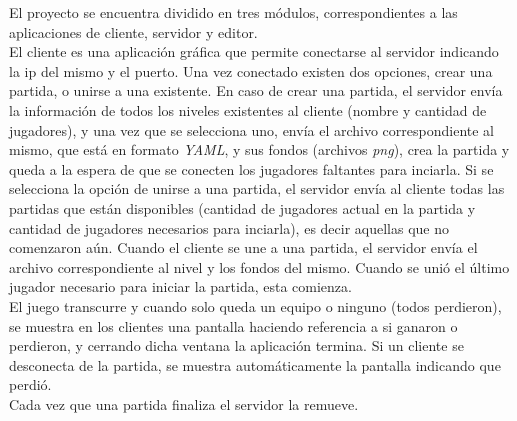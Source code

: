 El proyecto se encuentra dividido en tres módulos, correspondientes a las aplicaciones de cliente, servidor y editor.\\
\indent El cliente es una aplicación gráfica que permite conectarse al servidor indicando la ip del mismo y el puerto. Una vez conectado existen dos opciones, crear una partida, o unirse a una existente. En caso de crear una partida, el servidor envía la información de todos los niveles existentes al cliente (nombre y cantidad de jugadores), y una vez que se selecciona uno, envía el archivo correspondiente al mismo, que está en formato \textit{YAML}, y sus fondos (archivos \textit{png}), crea la partida y queda a la espera de que se conecten los jugadores faltantes para inciarla. Si se selecciona la opción de unirse a una partida, el servidor envía al cliente todas las partidas que están disponibles (cantidad de jugadores actual en la partida y cantidad de jugadores necesarios para inciarla), es decir aquellas que no comenzaron aún. Cuando el cliente se une a una partida, el servidor envía el archivo correspondiente al nivel y los fondos del mismo. Cuando se unió el último jugador necesario para iniciar la partida, esta comienza.\\
\indent El juego transcurre y cuando solo queda un equipo o ninguno (todos perdieron), se muestra en los clientes una pantalla haciendo referencia a si ganaron o perdieron, y cerrando dicha ventana la aplicación termina. Si un cliente se desconecta de la partida, se muestra automáticamente la pantalla indicando que perdió.\\
\indent Cada vez que una partida finaliza el servidor la remueve.
